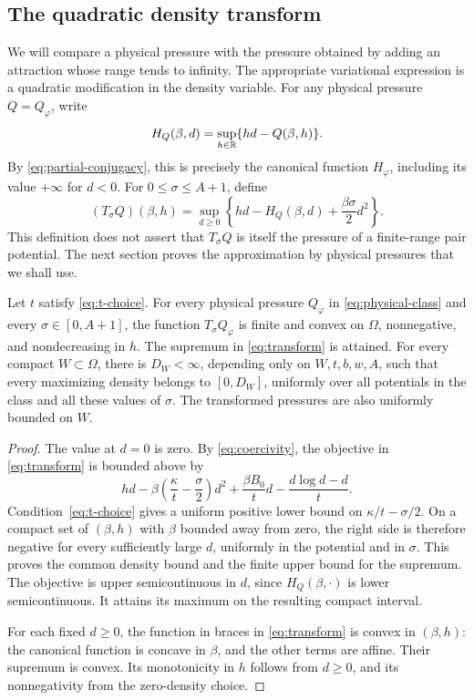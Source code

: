 \subsection{The quadratic density transform}

We will compare a physical pressure with the pressure obtained by
adding an attraction whose range tends to infinity. The appropriate
variational expression is a quadratic modification in the density
variable. For any physical pressure $Q=Q_\varphi$, write
\[
 H_Q(\beta,d)=\sup_{h\in\mathbb R}\{hd-Q(\beta,h)\}.
\]
By \eqref{eq:partial-conjugacy}, this is precisely the canonical
function $H_\varphi$, including its value $+\infty$ for $d<0$.
For $0\le\sigma\le A+1$, define
\begin{equation}
 (T_\sigma Q)(\beta,h)
 =\sup_{d\ge0}
   \left\{hd-H_Q(\beta,d)+\frac{\beta\sigma}{2}d^2\right\}.
 \label{eq:transform}
\end{equation}
This definition does not assert that $T_\sigma Q$ is itself the
pressure of a finite-range pair potential. The next section proves
the approximation by physical pressures that we shall use.

\begin{proposition}
\label{prop:transform}
Let $t$ satisfy \eqref{eq:t-choice}. For every physical pressure
$Q_\varphi$ in \eqref{eq:physical-class} and every
$\sigma\in[0,A+1]$, the function $T_\sigma Q_\varphi$ is finite
and convex on $\Omega$, nonnegative, and nondecreasing in $h$.
The supremum in \eqref{eq:transform} is attained. For every compact
$W\subset\Omega$, there is $D_W<\infty$, depending only on
$W,t,b,w,A$, such that every maximizing density belongs to
$[0,D_W]$, uniformly over all potentials in the class and all these
values of $\sigma$. The transformed pressures are also uniformly
bounded on $W$.
\end{proposition}

\begin{proof}
The value at $d=0$ is zero. By \eqref{eq:coercivity}, the objective
in \eqref{eq:transform} is bounded above by
\begin{equation}
 hd-\beta\left(\frac\kappa t-\frac\sigma2\right)d^2
       +\frac{\beta B_0}{t}d
       -\frac{d\log d-d}{t}.
 \label{eq:transform-coercivity}
\end{equation}
Condition~\eqref{eq:t-choice} gives a uniform positive lower bound
on $\kappa/t-\sigma/2$. On a compact set of $(\beta,h)$ with
$\beta$ bounded away from zero, the right side is therefore
negative for every sufficiently large $d$, uniformly in the
potential and in $\sigma$. This proves the common density bound
and the finite upper bound for the supremum. The objective is upper
semicontinuous in $d$, since $H_Q(\beta,\cdot)$ is lower
semicontinuous. It attains its maximum on the resulting compact
interval.

For each fixed $d\ge0$, the function in braces in
\eqref{eq:transform} is convex in $(\beta,h)$: the canonical
function is concave in $\beta$, and the other terms are affine.
Their supremum is convex. Its monotonicity in $h$ follows from
$d\ge0$, and its nonnegativity from the zero-density choice.
\end{proof}

